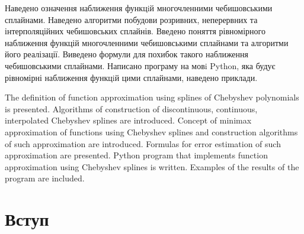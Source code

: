 \documentclass[ukrainian,14pt]{extarticle}
\begin{document}
Наведено означення наближення функцiй многочленними чебишовськими сплайнами. Наведено алгоритми побудови розривних, неперервних та інтерполяційних чебишовських сплайнів.
Введено поняття рівномірного наближення функцій многочленними чебишовськими
сплайнами та алгоритми його реалізації. 
Виведено формули для похибок
такого наближення чебишовськими сплайнами. 
Написано програму на
мовi Python, яка будує рівномірні наближення функцiй цими сплайнами,
наведено приклади.

\vspace{1cm}

The definition of function approximation using splines of Chebyshev polynomials is presented. Algorithms of construction of discontinuous, continuous, interpolated Chebyshev splines are introduced. Concept of minimax approximation of functions using Chebyshev splines and construction algorithms of such approximation are introduced. Formulas for error estimation of such approximation are presented. Python program that implements function approximation using Chebyshev splines is written. Examples of the results of the program are included.

\thispagestyle{empty}

\newpage
\tableofcontents
\newpage


\section*{Вступ}
\end{document}
